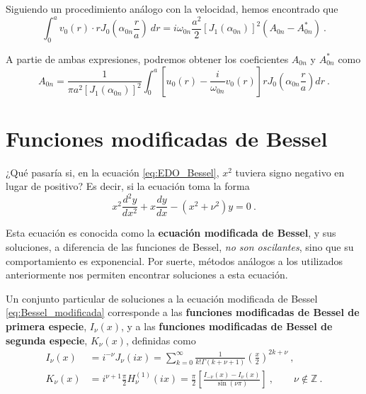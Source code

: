 \begin{ejemplo}
    Siguiendo un procedimiento análogo con la velocidad, hemos encontrado que
    \begin{equation*}
        \int_0^a v_0(r) \cdot r J_0\left( \alpha_{0n} \frac{r}{a} \right) \ dr = i \omega_{0n} \frac{a^2}{2} [J_1(\alpha_{0n})]^2 (A_{0n} - A^\ast_{0n}) \ .
    \end{equation*}

    A partie de ambas expresiones, podremos obtener los coeficientes $A_{0n}$ y $A^\ast_{0n}$ como
    \begin{equation*}
        A_{0n} = \frac{1}{\pi a^2 [J_1(\alpha_{0n})]^2} \int_0^a \left[ u_0(r) - \dfrac{i}{\omega_{0n}} v_0(r) \right] r J_0\left( \alpha_{0n} \frac{r}{a} \right) dr \ .
    \end{equation*}

\end{ejemplo}

\section{Funciones modificadas de Bessel}

¿Qué pasaría si, en la ecuación \eqref{eq:EDO_Bessel}, $x^2$ tuviera signo negativo en lugar de positivo? Es decir, si la ecuación toma la forma
\begin{equation}\label{eq:Bessel_modificada}
    x^2 \frac{d^2y}{dx^2} + x \frac{dy}{dx} - (x^2 + \nu^2)y = 0 \ . 
\end{equation}

Esta ecuación es conocida como la \textbf{ecuación modificada de Bessel}, y sus soluciones, a diferencia de las funciones de Bessel, \emph{no son oscilantes}, sino que su comportamiento es exponencial. Por suerte, métodos análogos a los utilizados anteriormente nos permiten encontrar soluciones a esta ecuación.

\begin{defi} 
    Un conjunto particular de soluciones a la ecuación modificada de Bessel \eqref{eq:Bessel_modificada} corresponde a las \textbf{funciones modificadas de Bessel de primera especie}, $I_\nu(x)$, y a las \textbf{funciones modificadas de Bessel de segunda especie}, $K_\nu(x)$, definidas como
    \begin{align}
        I_\nu(x) & = i^{-\nu} J_\nu(ix) = \sum_{k=0}^\infty \frac{1}{k! \Gamma(k+\nu+1)} \left( \frac{x}{2} \right)^{2k+\nu} \ , \\
        K_\nu(x) & = i^{\nu + 1} \frac{\pi}{2} H_\nu^{(1)}(ix) = \frac{\pi}{2} \left[ \frac{I_{-\nu}(x) - I_\nu(x)}{\sin(\nu \pi)} \right] \ , \qquad \nu \notin \mathbb{Z} \ .
    \end{align}
\end{defi}

